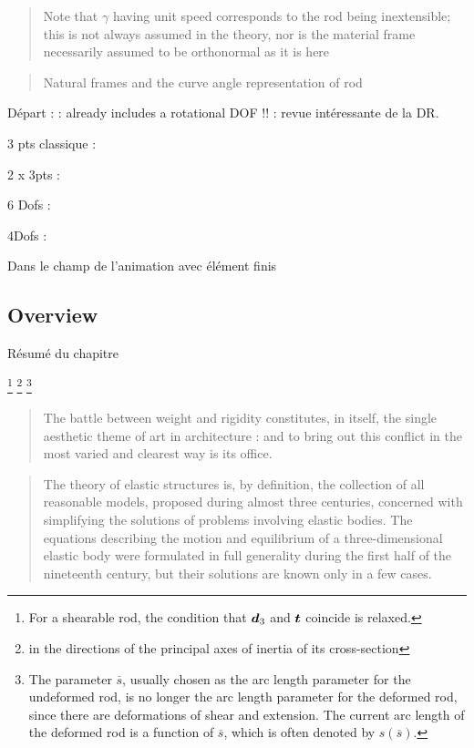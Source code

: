 \blockcquote[p.~607]{Langer1996}{Note that $\gamma$ having unit speed corresponds to the rod being inextensible; this is not always assumed in the theory, nor is the material frame necessarily assumed to be orthonormal as it is here}

\blockcquote[p.~607]{Langer1996}{Natural frames and the curve angle representation of rod}


Départ :
\cite{Day1965} : already includes a rotational DOF !!
\cite{Wakefield1980}
\cite{Barnes1999} : revue intéressante de la DR.

3 pts classique :
\cite{Adriaenssens1999}
\cite{Douthe2006}

2 x 3pts :
\cite{Barnes2013}

6 Dofs :
\cite{DAmico2014}

4Dofs :
\cite{DuPeloux2015}
\cite{DAmico2016}

Dans le champ de l'animation  avec élément finis
\cite{Duan2013}
\cite{Meier2014}


\subsection{Overview}
Résumé du chapitre

\footnote{For a shearable rod, the condition that $\boldsymbol{d}_3$ and $\boldsymbol{t}$ coincide is relaxed.}
\footnote{in the directions of the principal axes of inertia of its cross-section}
\footnote{The parameter $\overbar{s}$, usually chosen as the arc length parameter for the undeformed rod, is no longer the arc length parameter for the deformed rod, since there are deformations of shear and extension. The current arc length of the deformed rod is a function of $\overbar{s}$, which is often denoted by $s(\overbar{s})$.}


\blockcquote[p.~xvii]{Benvenuto1991b}{The battle between weight and rigidity constitutes, in itself, the single aesthetic theme of art in architecture : and to bring out this conflict in the most varied and clearest way is its office.}

\blockcquote[p.~xvii]{Villaggio1997}{The theory of elastic structures is, by definition, the collection of all reasonable models, proposed during almost three centuries, concerned with simplifying the solutions of problems involving elastic bodies. The equations describing the motion and equilibrium of a three-dimensional elastic body were formulated in full generality during the first half of the nineteenth century, but their solutions are known only in a few cases.}

